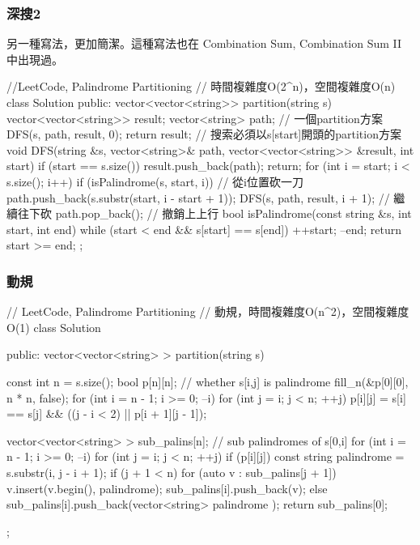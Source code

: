 \subsubsection{深搜2}
另一種寫法，更加簡潔。這種寫法也在 Combination Sum, Combination Sum II 中出現過。
\begin{Code}
//LeetCode, Palindrome Partitioning
// 時間複雜度O(2^n)，空間複雜度O(n)
class Solution {
public:
    vector<vector<string>> partition(string s) {
        vector<vector<string>> result;
        vector<string> path;  // 一個partition方案
        DFS(s, path, result, 0);
        return result;
    }
    // 搜索必須以s[start]開頭的partition方案
    void DFS(string &s, vector<string>& path,
            vector<vector<string>> &result, int start) {
        if (start == s.size()) {
            result.push_back(path);
            return;
        }
        for (int i = start; i < s.size(); i++) {
            if (isPalindrome(s, start, i)) { // 從i位置砍一刀
                path.push_back(s.substr(start, i - start + 1));
                DFS(s, path, result, i + 1);  // 繼續往下砍
                path.pop_back(); // 撤銷上上行
            }
        }
    }
    bool isPalindrome(const string &s, int start, int end) {
        while (start < end && s[start] == s[end]) {
            ++start;
            --end;
        }
        return start >= end;
    }
};
\end{Code}


\subsubsection{動規}
\begin{Code}
// LeetCode, Palindrome Partitioning
// 動規，時間複雜度O(n^2)，空間複雜度O(1)
class Solution {
public:
    vector<vector<string> > partition(string s) {
        const int n = s.size();
        bool p[n][n]; // whether s[i,j] is palindrome
        fill_n(&p[0][0], n * n, false);
        for (int i = n - 1; i >= 0; --i)
            for (int j = i; j < n; ++j)
                p[i][j] = s[i] == s[j] && ((j - i < 2) || p[i + 1][j - 1]);

        vector<vector<string> > sub_palins[n]; // sub palindromes of s[0,i]
        for (int i = n - 1; i >= 0; --i) {
            for (int j = i; j < n; ++j)
                if (p[i][j]) {
                    const string palindrome = s.substr(i, j - i + 1);
                    if (j + 1 < n) {
                        for (auto v : sub_palins[j + 1]) {
                            v.insert(v.begin(), palindrome);
                            sub_palins[i].push_back(v);
                        }
                    } else {
                        sub_palins[i].push_back(vector<string> { palindrome });
                    }
                }
        }
        return sub_palins[0];
    }
};
\end{Code}


